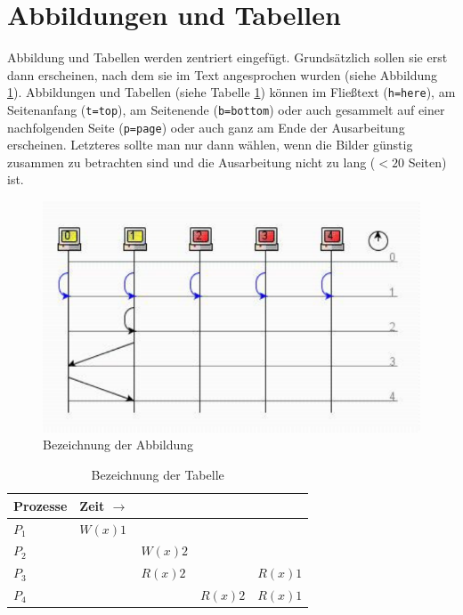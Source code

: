 \section{Abbildungen und Tabellen}

Abbildung und Tabellen werden zentriert eingefügt. Grundsätzlich sollen sie erst dann erscheinen, nach dem sie im Text angesprochen wurden (siehe Abbildung \ref{a1}). Abbildungen und Tabellen (siehe Tabelle \ref{t1}) können im Fließtext (\verb|h=here|), am Seitenanfang (\verb|t=top|), am Seitenende (\verb|b=bottom|) oder auch gesammelt auf einer nachfolgenden Seite (\verb|p=page|) oder auch ganz am Ende der Ausarbeitung erscheinen. Letzteres sollte man nur dann wählen, wenn die Bilder günstig zusammen zu betrachten sind und die Ausarbeitung nicht zu lang ($< 20$ Seiten) ist.

\begin{figure} %
	\centering
	\includegraphics{images/sequence.pdf}
	\caption{Bezeichnung der Abbildung}
	\label{a1}
\end{figure}

\begin{table} %
	\centering
	\begin{tabular}{l | l l l l}
		\textbf{Prozesse} & \textbf{Zeit} $\rightarrow$ \\
		\hline
		$P_{1}$ & $W(x)1$ \\
		$P_{2}$ & & $W(x)2$ \\
		$P_{3}$ & & $R(x)2$ & & $R(x)1$\\
		$P_{4}$ & & & $R(x)2$ & $R(x)1$\\
	\end{tabular}
	\caption{Bezeichnung der Tabelle}
	\label{t1}
\end{table}

